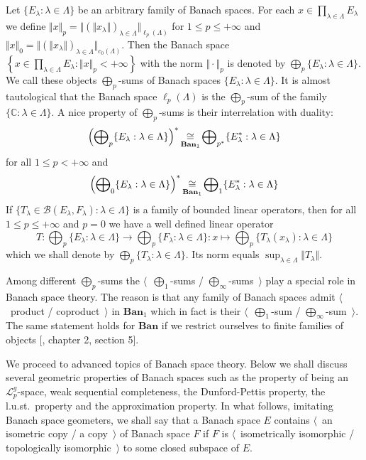Let $ \{E_\lambda:\lambda\in\Lambda \}$ be an arbitrary family of Banach spaces.
For each $x\in \prod_{\lambda\in\Lambda} E_\lambda$ we define 
$\Vert x\Vert_p
=\Vert{
  (\Vert x_\lambda\Vert)}_{\lambda\in\Lambda}
\Vert_{\ell_p(\Lambda)}$
for $1\leq p\leq +\infty$ and 
$\Vert x\Vert_0
=\Vert
  {(\Vert x_\lambda\Vert)}_{\lambda\in\Lambda}
\Vert_{c_0(\Lambda)}$. 
Then the Banach space
$\left \{
  x\in \prod_{\lambda\in\Lambda} E_\lambda
  :\Vert x\Vert_p<+\infty
\right \}$ 
with the norm $\Vert\cdot\Vert_p$ is denoted by $\bigoplus_p
\{E_\lambda:\lambda\in\Lambda \}$. We call these objects $\bigoplus_p$-sums of
Banach spaces $ \{E_\lambda:\lambda\in\Lambda \}$. It is almost tautological
that the Banach space $\ell_p(\Lambda)$ is the $\bigoplus_p$-sum of the family $
\{\mathbb{C}:\lambda\in\Lambda \}$. A nice property of $\bigoplus_p$-sums is
their interrelation with duality:
$$
{\left(\bigoplus\nolimits_p \{E_\lambda:\lambda\in\Lambda \}\right)}^*
\mathop{\mathbin{\cong}}\limits_{\mathbf{Ban}_1}
\bigoplus\nolimits_{p^*} \{E_\lambda^*:\lambda\in\Lambda \}
$$
for all $1\leq p<+\infty$ and 
$$
{\left(\bigoplus\nolimits_0 \{E_\lambda:\lambda\in\Lambda \}\right)}^*
\mathop{\mathbin{\cong}}\limits_{\mathbf{Ban}_1}
\bigoplus\nolimits_1 \{E_\lambda^*:\lambda\in\Lambda \}
$$
If $ \{T_\lambda\in\mathcal{B}(E_\lambda, F_\lambda):\lambda\in\Lambda \}$ is a
family of bounded linear operators, then for all $1\leq p\leq+\infty$ and $p=0$
we have a well defined linear operator
$$
T:\bigoplus\nolimits_p \{E_\lambda:\lambda\in\Lambda \}
  \to 
\bigoplus\nolimits_p \{ F_\lambda:\lambda\in\Lambda \}
:x\mapsto \bigoplus\nolimits_p \{ T_\lambda(x_\lambda):\lambda\in\Lambda \}
$$
which we shall denote by $\bigoplus_p \{T_\lambda:\lambda\in\Lambda \}$. Its
norm equals $\sup_{\lambda\in\Lambda}\Vert T_\lambda\Vert$.

Among different $\bigoplus_p$-sums the $\langle$~$\bigoplus_1$-sums /
$\bigoplus_\infty$-sums~$\rangle$ play a special role in Banach space theory.
The reason is that any family of Banach spaces admit $\langle$~product /
coproduct~$\rangle$ in $\mathbf{Ban}_1$ which in fact is their
$\langle$~$\bigoplus_1$-sum / $\bigoplus_\infty$-sum~$\rangle$. The same
statement holds for $\mathbf{Ban}$ if we restrict ourselves to finite families
of objects [\cite{HelLectAndExOnFuncAn}, chapter 2, section 5].

We proceed to advanced topics of Banach space theory. Below we shall discuss
several geometric properties of Banach spaces such as the property of being an
$\mathscr{L}_p^g$-space, weak sequential completeness, the Dunford-Pettis
property, the l.u.st.\ property and the approximation property. In what follows,
imitating Banach space geometers, we shall say that a Banach space $E$ contains
$\langle$~an isometric copy / a copy~$\rangle$ of Banach space $F$ if $F$ is
$\langle$~isometrically isomorphic / topologically isomorphic~$\rangle$ to some
closed subspace of $E$.

